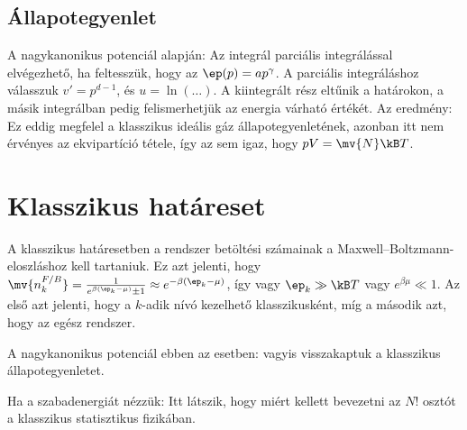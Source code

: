   \subsection{Állapotegyenlet}
   
   A nagykanonikus potenciál alapján:
   Az integrál parciális integrálással elvégezhető, ha feltesszük, hogy az $\ep(p)=a p^\gamma$.
   A parciális integráláshoz válasszuk $v'=p^{d-1}$, és $u=\ln(\dots)$.
   A kiintegrált rész eltűnik a határokon, a másik integrálban pedig felismerhetjük az energia várható értékét.
   Az eredmény:
   Ez eddig megfelel a klasszikus ideális gáz állapotegyenletének, azonban itt nem érvényes az ekvipartíció tétele, így az sem igaz, hogy $pV=\mv{N} \kB T$.
   
 \section{Klasszikus határeset}
  
  A klasszikus határesetben a rendszer betöltési számainak a Maxwell--Boltzmann-eloszláshoz kell tartaniuk.
   Ez azt jelenti, hogy $\mv{n^{F/B}_k}=\frac{1}{e^{\beta(\ep_k-\mu)}\pm 1}\approx e^{-\beta(\ep_k-\mu)}$, így vagy $\ep_k\gg \kB T$ vagy $e^{\beta\mu}\ll 1$.
   Az első azt jelenti, hogy a $k$-adik nívó kezelhető klasszikusként, míg a második azt, hogy az egész rendszer. 
  
  A nagykanonikus potenciál ebben az esetben:
  vagyis visszakaptuk a klasszikus állapotegyenletet.
  
  Ha a szabadenergiát nézzük:
  Itt látszik, hogy miért kellett bevezetni az $N!$ osztót a klasszikus statisztikus fizikában.
  
